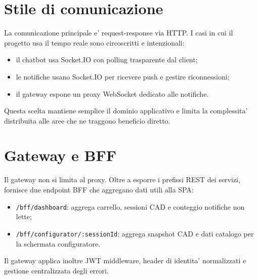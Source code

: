 \section{Stile di comunicazione}

La comunicazione principale e' request-response via HTTP. I casi in cui il progetto usa il tempo reale sono circoscritti e intenzionali:

\begin{itemize}
\item il chatbot usa Socket.IO con polling trasparente dal client;
\item le notifiche usano Socket.IO per ricevere push e gestire riconnessioni;
\item il gateway espone un proxy WebSocket dedicato alle notifiche.
\end{itemize}

Questa scelta mantiene semplice il dominio applicativo e limita la complessita' distribuita alle aree che ne traggono beneficio diretto.

\section{Gateway e BFF}

Il gateway non si limita al proxy. Oltre a esporre i prefissi REST dei servizi, fornisce due endpoint BFF che aggregano dati utili alla SPA:

\begin{itemize}
\item \texttt{/bff/dashboard}: aggrega carrello, sessioni CAD e conteggio notifiche non lette;
\item \texttt{/bff/configurator/:sessionId}: aggrega snapshot CAD e dati catalogo per la schermata configuratore.
\end{itemize}

Il gateway applica inoltre JWT middleware, header di identita' normalizzati e gestione centralizzata degli errori.
